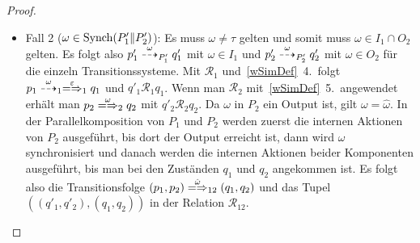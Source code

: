 \begin{proof}
\begin{enumerate}
\begin{itemize}
        \item Fall 2 ($\omega\in\mathrm{Synch} (P'_1\|P'_2)$): Es muss $\omega\neq\tau$
          gelten und somit muss \oBdA{} $\omega\in I_1\cap O_2$ gelten. Es
          folgt also $p'_1\may[\omega]_{P'_1} q'_1$ mit $\omega\in I_1$ und
          $p'_2\may[\omega]_{P'_2} q'_2$ mit $\omega\in O_2$ für die einzeln
          Transitionssysteme. Mit $\mathcal{R}_1$ und~\ref{wSimDef}~4.\ folgt
          $p_1\may[\omega]_1 \weakmay[\varepsilon]_1 q_1$ und $q'_1
          \mathcal{R}_1 q_1$. Wenn man $\mathcal{R}_2$ mit~\ref{wSimDef}~5.\
          angewendet erhält man $p_2 \weakmay[\omega]_2 q_2$ mit
          $q'_2\mathcal{R}_2 q_2$. Da $\omega$ in $P_2$ ein Output ist, gilt
          $\omega =\hat{\omega}$. In der Parallelkomposition von $P_1$ und
          $P_2$ werden zuerst die internen Aktionen von $P_2$ ausgeführt, bis
          dort der Output erreicht ist, dann wird $\omega$ synchronisiert und
          danach werden die internen Aktionen beider Komponenten ausgeführt,
          bis man bei den Zuständen $q_1$ und $q_2$ angekommen ist. Es folgt
          also die Transitionsfolge $(p_1,p_2) \weakmay[\hat{\omega}]_{12}
          (q_1,q_2)$ und das Tupel $((q'_1,q'_2),(q_1,q_2))$ in der Relation
          $\mathcal{R}_{12}$.
      \end{itemize}
  \end{enumerate}
\end{proof}

